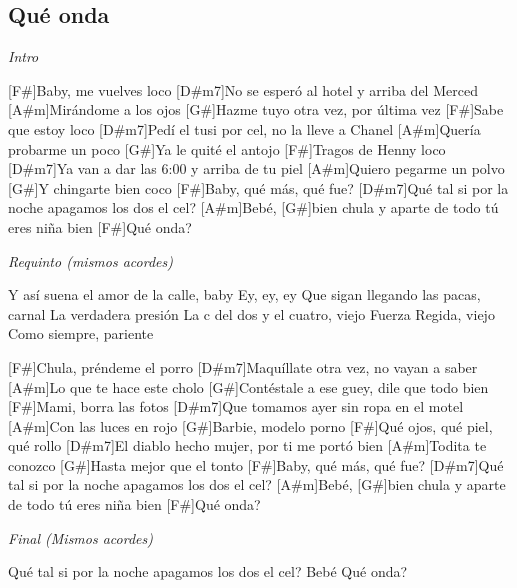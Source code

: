 \subsection{Qu\'e onda}

\noindent
\vspace{1cm}

\begin{guitar}
	\begin{multicols}{2}

	\textit{Intro}

	[F#]Baby, me vuelves loco
	[D#m7]No se esper\'o al hotel y arriba del Merced
	[A#m]Mir\'andome a los ojos
	[G#]Hazme tuyo otra vez, por \'ultima vez
	[F#]Sabe que estoy loco
	[D#m7]Ped\'i el tusi por cel, no la lleve a Chanel
	[A#m]Quer\'ia probarme un poco
	[G#]Ya le quit\'e el antojo
	[F#]Tragos de Henny loco
	[D#m7]Ya van a dar las 6:00 y arriba de tu piel
	[A#m]Quiero pegarme un polvo
	[G#]Y chingarte bien coco
	[F#]Baby, qu\'e m\'as, qué fue?
	[D#m7]Qu\'e tal si por la noche apagamos los dos el cel?
	[A#m]Beb\'e, [G#]bien chula y aparte de todo t\'u eres ni\~{n}a bien
	[F#]Qu\'e onda?


	\textit{Requinto (mismos acordes)}

	Y as\'i suena el amor de la calle, baby
	Ey, ey, ey
	Que sigan llegando las pacas, carnal
	La verdadera presi\'on
	La c del dos y el cuatro, viejo
	Fuerza Regida, viejo
	Como siempre, pariente


	[F#]Chula, pr\'endeme el porro
	[D#m7]Maqu\'illate otra vez, no vayan a saber
	[A#m]Lo que te hace este cholo
	[G#]Cont\'estale a ese guey, dile que todo bien
	[F#]Mami, borra las fotos
	[D#m7]Que tomamos ayer sin ropa en el motel
	[A#m]Con las luces en rojo
	[G#]Barbie, modelo porno
	[F#]Qu\'e ojos, qu\'e piel, qu\'e rollo
	[D#m7]El diablo hecho mujer, por ti me port\'o bien
	[A#m]Todita te conozco
	[G#]Hasta mejor que el tonto
	[F#]Baby, qu\'e m\'as, qué fue?
	[D#m7]Qu\'e tal si por la noche apagamos los dos el cel?
	[A#m]Beb\'e, [G#]bien chula y aparte de todo t\'u eres niña bien
	[F#]Qu\'e onda?


	\textit{Final (Mismos acordes)}

	Qu\'e tal si por la noche apagamos los dos el cel?
	Beb\'e
	Qu\'e onda?

	\end{multicols}
\end{guitar}
